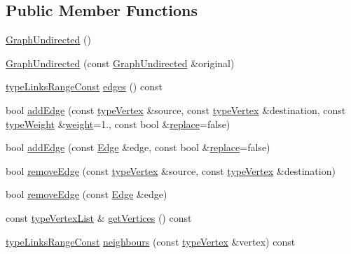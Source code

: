 \subsection*{Public Member Functions}
\begin{DoxyCompactItemize}
\item 
\hyperlink{classGraphUndirected_a00b1e3fe0aaa6fd6e63b94920e40a0ed}{Graph\+Undirected} ()
\item 
\hyperlink{classGraphUndirected_a882c4cec7971177f9eab04319b5b0b62}{Graph\+Undirected} (const \hyperlink{classGraphUndirected}{Graph\+Undirected} \&original)
\item 
\hyperlink{graphInterface_8h_ae8d27008f15586bbf419af7ad2e0a48a}{type\+Links\+Range\+Const} \hyperlink{classGraphUndirected_aa6fa3435fb456f1a7e9642b631878431}{edges} () const
\item 
bool \hyperlink{classGraphUndirected_a2be69d987f3b4fa1cf547898d30b47d2}{add\+Edge} (const \hyperlink{edge_8h_a5fbd20c46956d479cb10afc9855223f6}{type\+Vertex} \&source, const \hyperlink{edge_8h_a5fbd20c46956d479cb10afc9855223f6}{type\+Vertex} \&destination, const \hyperlink{edge_8h_a2e7ea3be891ac8b52f749ec73fee6dd2}{type\+Weight} \&\hyperlink{classGraphUndirected_ae40d431c92d8b4884c7915c44d42f356}{weight}=1., const bool \&\hyperlink{classGraphUndirected_aee3bc279ffe39f8efb7dd60865279474}{replace}=false)
\item 
bool \hyperlink{classGraphUndirected_a366c8b7dbf1cbfe408d5399ad64494dc}{add\+Edge} (const \hyperlink{classEdge}{Edge} \&edge, const bool \&\hyperlink{classGraphUndirected_aee3bc279ffe39f8efb7dd60865279474}{replace}=false)
\item 
bool \hyperlink{classGraphUndirected_af4a40541132a66c9b688a20958057751}{remove\+Edge} (const \hyperlink{edge_8h_a5fbd20c46956d479cb10afc9855223f6}{type\+Vertex} \&source, const \hyperlink{edge_8h_a5fbd20c46956d479cb10afc9855223f6}{type\+Vertex} \&destination)
\item 
bool \hyperlink{classGraphUndirected_ad39275e7a8f7a39734916b8c5400a1d6}{remove\+Edge} (const \hyperlink{classEdge}{Edge} \&edge)
\item 
const \hyperlink{graphInterface_8h_a21d54d8a139def524d3b0d6f71ec4974}{type\+Vertex\+List} \& \hyperlink{classGraphUndirected_af2f65109919c878a1fd7637d3bfe0991}{get\+Vertices} () const
\item 
\hyperlink{graphInterface_8h_ae8d27008f15586bbf419af7ad2e0a48a}{type\+Links\+Range\+Const} \hyperlink{classGraphUndirected_a5c8c85acc5ea87f43ac0dcbde61f06e0}{neighbours} (const \hyperlink{edge_8h_a5fbd20c46956d479cb10afc9855223f6}{type\+Vertex} \&vertex) const

\end{DoxyCompactItemize}
